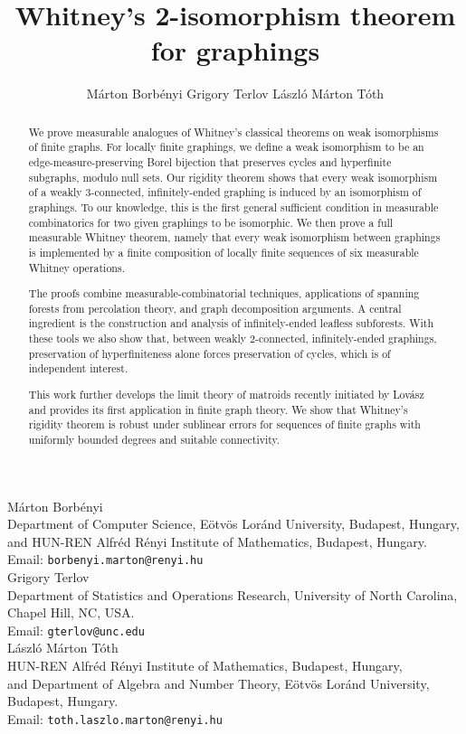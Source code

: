\documentclass{article}
\title{Whitney's 2-isomorphism theorem for graphings}
\author{
Márton Borbényi \qquad
Grigory Terlov \qquad
László Márton Tóth
}
\date{}
\theoremstyle{plain}
\theoremstyle{definition}
\begin{document}
\maketitle


\begin{abstract}
We prove measurable analogues of Whitney's classical theorems on weak isomorphisms of finite graphs. For locally finite graphings, we define a weak isomorphism to be an edge-measure-preserving Borel bijection that preserves cycles and hyperfinite subgraphs, modulo null sets. Our rigidity theorem shows that every weak isomorphism of a weakly $3$-connected, infinitely-ended graphing is induced by an isomorphism of graphings. To our knowledge, this is the first general sufficient condition in measurable combinatorics for two given graphings to be isomorphic. We then prove a full measurable Whitney theorem, namely that every weak isomorphism between graphings is implemented by a finite composition of locally finite sequences of six measurable Whitney operations. 

The proofs combine measurable-combinatorial techniques, applications of spanning forests from percolation theory, and graph decomposition arguments. A central ingredient is the construction and analysis of infinitely-ended leafless subforests. 
With these tools we also show that, between weakly $2$-connected, infinitely-ended graphings, preservation of hyperfiniteness alone forces preservation of cycles, which is of independent interest.

This work further develops the limit theory of matroids recently initiated by Lovász and provides its first application in finite graph theory. We show that Whitney's rigidity theorem is robust under sublinear errors for sequences of finite graphs with uniformly bounded degrees and suitable connectivity. 
\end{abstract}

\vfill

\noindent
{\sc Márton Borbényi}\\
Department of Computer Science, Eötvös Loránd University, Budapest, Hungary,\\ and HUN-REN Alfréd Rényi Institute of Mathematics, Budapest, Hungary.\\ Email: \texttt{borbenyi.marton@renyi.hu}
\medskip
\ \\
{\sc Grigory Terlov}\\
Department of Statistics and Operations Research, University of North Carolina, Chapel Hill, NC, USA.\\ 
Email: \texttt{gterlov@unc.edu}
\medskip
\ \\
{\sc László Márton Tóth}\\
HUN-REN Alfréd Rényi Institute of Mathematics, Budapest, Hungary,\\
and Department of Algebra and Number Theory, Eötvös Loránd University, Budapest, Hungary.\\
Email: \texttt{toth.laszlo.marton@renyi.hu}
\end{document}
